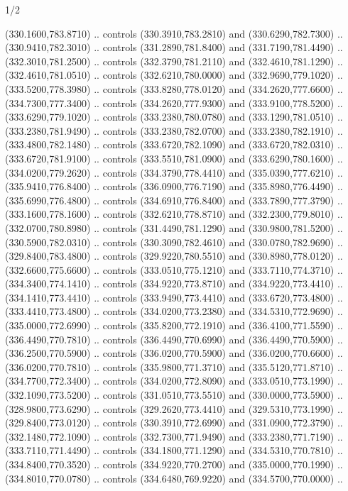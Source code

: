 \begin{flagdescription}{1/2}
\begin{scope}[xshift=0.5\flaglength]
\begin{scope}[scale=0.00745\flagwidth,xshift=-12.1mm,yshift=41.7mm]
\begin{scope}[y=0.80pt, x=0.80pt, yscale=-1, xscale=1, inner sep=0pt, outer sep=0pt]
\begin{scope}[cm={{1.33333,0.0,0.0,-1.33333,(0.0,114.66667)}}]
\begin{scope}[scale=0.100]
  (330.1600,783.8710) .. controls (330.3910,783.2810) and (330.6290,782.7300) ..
  (330.9410,782.3010) .. controls (331.2890,781.8400) and (331.7190,781.4490) ..
  (332.3010,781.2500) .. controls (332.3790,781.2110) and (332.4610,781.1290) ..
  (332.4610,781.0510) .. controls (332.6210,780.0000) and (332.9690,779.1020) ..
  (333.5200,778.3980) .. controls (333.8280,778.0120) and (334.2620,777.6600) ..
  (334.7300,777.3400) .. controls (334.2620,777.9300) and (333.9100,778.5200) ..
  (333.6290,779.1020) .. controls (333.2380,780.0780) and (333.1290,781.0510) ..
  (333.2380,781.9490) .. controls (333.2380,782.0700) and (333.2380,782.1910) ..
  (333.4800,782.1480) .. controls (333.6720,782.1090) and (333.6720,782.0310) ..
  (333.6720,781.9100) .. controls (333.5510,781.0900) and (333.6290,780.1600) ..
  (334.0200,779.2620) .. controls (334.3790,778.4410) and (335.0390,777.6210) ..
  (335.9410,776.8400) .. controls (336.0900,776.7190) and (335.8980,776.4490) ..
  (335.6990,776.4800) .. controls (334.6910,776.8400) and (333.7890,777.3790) ..
  (333.1600,778.1600) .. controls (332.6210,778.8710) and (332.2300,779.8010) ..
  (332.0700,780.8980) .. controls (331.4490,781.1290) and (330.9800,781.5200) ..
  (330.5900,782.0310) .. controls (330.3090,782.4610) and (330.0780,782.9690) ..
  (329.8400,783.4800) .. controls (329.9220,780.5510) and (330.8980,778.0120) ..
  (332.6600,775.6600) .. controls (333.0510,775.1210) and (333.7110,774.3710) ..
  (334.3400,774.1410) .. controls (334.9220,773.8710) and (334.9220,773.4410) ..
  (334.1410,773.4410) .. controls (333.9490,773.4410) and (333.6720,773.4800) ..
  (333.4410,773.4800) .. controls (334.0200,773.2380) and (334.5310,772.9690) ..
  (335.0000,772.6990) .. controls (335.8200,772.1910) and (336.4100,771.5590) ..
  (336.4490,770.7810) .. controls (336.4490,770.6990) and (336.4490,770.5900) ..
  (336.2500,770.5900) .. controls (336.0200,770.5900) and (336.0200,770.6600) ..
  (336.0200,770.7810) .. controls (335.9800,771.3710) and (335.5120,771.8710) ..
  (334.7700,772.3400) .. controls (334.0200,772.8090) and (333.0510,773.1990) ..
  (332.1090,773.5200) .. controls (331.0510,773.5510) and (330.0000,773.5900) ..
  (328.9800,773.6290) .. controls (329.2620,773.4410) and (329.5310,773.1990) ..
  (329.8400,773.0120) .. controls (330.3910,772.6990) and (331.0900,772.3790) ..
  (332.1480,772.1090) .. controls (332.7300,771.9490) and (333.2380,771.7190) ..
  (333.7110,771.4490) .. controls (334.1800,771.1290) and (334.5310,770.7810) ..
  (334.8400,770.3520) .. controls (334.9220,770.2700) and (335.0000,770.1990) ..
  (334.8010,770.0780) .. controls (334.6480,769.9220) and (334.5700,770.0000) ..

\end{scope}
\end{scope}
\end{scope}
\end{scope}
\end{scope}
\end{flagdescription}
